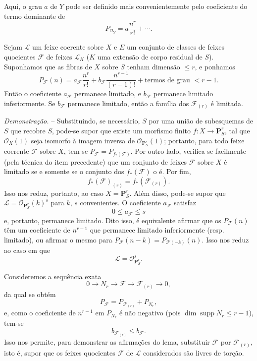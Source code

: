 Aqui, o grau $a$ de $Y$ pode ser definido mais convenientemente pelo
coeficiente do termo dominante de
\[
P_{\mathcal O_Y}=a\frac{n^r}{r!}+\cdots.
\]

 Sejam $\mathcal L$ um feixe coerente sobre $X$ e $E$ um
conjunto de classes de feixes quocientes $\mathcal F$ de feixes $\mathcal L_K$
($K$ uma extensão de corpo residual de $S$). Suponhamos que as fibras de $X$
sobre $S$ tenham dimensão $\leq r$, e ponhamos
\[
P_{\mathcal F}(n)=a_{\mathcal F}\frac{n^r}{r!}
+b_{\mathcal F}\frac{n^{r-1}}{(r-1)!}
+\text{termos de grau $<r-1$}.
\]
Então o coeficiente $a_{\mathcal F}$ permanece limitado, e $b_{\mathcal F}$
permanece limitado inferiormente. Se $b_{\mathcal F}$ permanece limitado,
então a família dos $\mathcal F_{(r)}$ é limitada.

\emph{Demonstração.} -- Substituindo, se necessário, $S$ por uma união de
subesquemas de $S$ que recobre $S$, pode-se supor que existe um morfismo finito
$f:X\longrightarrow\mathbf P^r_S$, tal que $\mathcal O_X(1)$ seja isomorfo à
imagem inversa de $\mathcal O_{\mathbf P^r_S}(1)$; portanto, para todo feixe
coerente $\mathcal F$ sobre $X$, tem-se
$P_{\mathcal F}=P_{f_*(\mathcal F)}$. Por outro lado, verifica-se facilmente
(pela técnica do item precedente) que um conjunto de feixes $\mathcal F$ sobre
$X$ é limitado se e somente se o conjunto dos $f_*(\mathcal F)$ o é. Por fim,
\[
f_*(\mathcal F)_{(r)}=f_*(\mathcal F_{(r)}).
\]
Isso nos reduz, portanto, ao caso $X=\mathbf P^r_S$. Além disso, pode-se supor
que $\mathcal L=\mathcal O_{\mathbf P^r_S}(k)^s$ para $k$, $s$ convenientes. O
coeficiente $a_{\mathcal F}$ satisfaz
\[
0\leq a_{\mathcal F}\leq s
\]
e, portanto, permanece limitado. Dito isso, é equivalente afirmar que os
$P_{\mathcal F}(n)$ têm um coeficiente de $n^{r-1}$ que permanece limitado
inferiormente (resp. limitado), ou afirmar o mesmo para
$P_{\mathcal F}(n-k)=P_{\mathcal F(-k)}(n)$. Isso nos reduz ao caso em que
\[
\mathcal L=\mathcal O_{\mathbf P^r_S}^{s}.
\]

Consideremos a sequência exata
\[
0\longrightarrow N_r\longrightarrow\mathcal F
\longrightarrow\mathcal F_{(r)}\longrightarrow0,
\]
da qual se obtém
\[
P_{\mathcal F}=P_{\mathcal F_{(r)}}+P_{N_r},
\]
e, como o coeficiente de $n^{r-1}$ em $P_{N_r}$ é não negativo (pois
$\dim\operatorname{supp}N_r\leq r-1$), tem-se
\[
b_{\mathcal F_{(r)}}\leq b_{\mathcal F}.
\]
Isso nos permite, para demonstrar as afirmações do lema, substituir
$\mathcal F$ por $\mathcal F_{(r)}$, isto é, supor que os feixes quocientes
$\mathcal F$ de $\mathcal L$ considerados são livres de torção.

